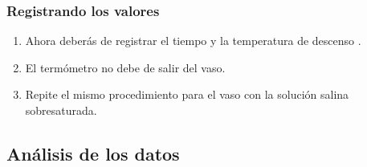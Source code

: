 \documentclass[14pt]{beamer}
\begin{document}
\begin{frame}
\frametitle{Registrando los valores}
\begin{enumerate}[<+->]
\conti
\item Ahora deberás de registrar el tiempo y la temperatura de descenso .
\item El termómetro no debe de salir del vaso.
\item Repite el mismo procedimiento para el vaso con la solución salina sobresaturada.
\end{enumerate}
\end{frame}

\subsection{Análisis de los datos}
\end{document}
